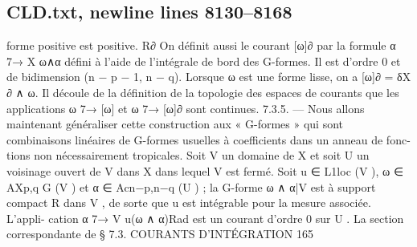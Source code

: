 \documentclass[
  10pt,
]{article}
\newenvironment{Shaded}{}{}
\newcommand{\NormalTok}[1]{#1}
\begin{document}
\subsection{CLD.txt, newline lines
8130--8168}\label{cld.txt-newline-lines-81308168}

\begin{Shaded}
\begin{Highlighting}[]
\NormalTok{forme positive est positive.                             R∂}
\NormalTok{   On définit aussi le courant [ω]∂ par la formule α 7→ X ω∧α défini à l’aide de l’intégrale}
\NormalTok{de bord des G{-}formes. Il est d’ordre 0 et de bidimension (n − p − 1, n − q). Lorsque ω}
\NormalTok{est une forme lisse, on a [ω]∂ = δX ∂}
\NormalTok{                                      ∧ ω.}
\NormalTok{   Il découle de la définition de la topologie des espaces de courants que les applications}
\NormalTok{ω 7→ [ω] et ω 7→ [ω]∂ sont continues.}
\NormalTok{7.3.5. — Nous allons maintenant généraliser cette construction aux « G{-}formes » qui}
\NormalTok{sont combinaisons linéaires de G{-}formes usuelles à coefficients dans un anneau de fonc{-}}
\NormalTok{tions non nécessairement tropicales.}
\NormalTok{   Soit V un domaine de X et soit U un voisinage ouvert de V dans X dans lequel V}
\NormalTok{est fermé. Soit u ∈ L1loc (V ), ω ∈ AXp,q}
\NormalTok{                                       G}
\NormalTok{                                          (V ) et α ∈ Acn−p,n−q (U ) ; la G{-}forme ω ∧ α|V est à}
\NormalTok{support compact}
\NormalTok{            R     dans V , de sorte que u est intégrable pour la mesure associée. L’appli{-}}
\NormalTok{cation α 7→ V u(ω ∧ α)Rad est un courant d’ordre 0 sur U . La section correspondante de}
\NormalTok{                              § 7.3. COURANTS D’INTÉGRATION                              165}


\end{Highlighting}
\end{Shaded}
\end{document}

